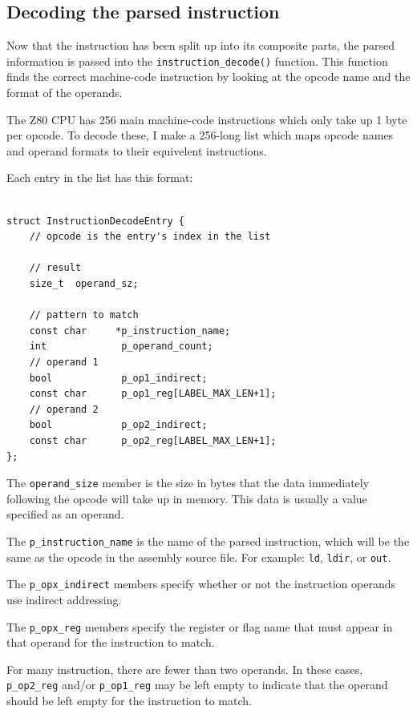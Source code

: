 \documentclass[a4paper]{report}
\begin{document}
\subsection{Decoding the parsed instruction}

Now that the instruction has been split up into its composite parts, the parsed
information is passed into the \texttt{instruction\_decode()} function. This
function finds the correct machine-code instruction by looking at the opcode
name and the format of the operands.

The Z80 CPU has 256 main machine-code instructions which only take up 1 byte per
opcode. To decode these, I make a 256-long list which maps opcode names and
operand formats to their equivelent instructions.

Each entry in the list has this format:

\begin{lstlisting}

struct InstructionDecodeEntry {
	// opcode is the entry's index in the list

	// result
	size_t	operand_sz;

	// pattern to match
	const char 	   *p_instruction_name;
	int				p_operand_count;
	// operand 1
	bool			p_op1_indirect;
	const char		p_op1_reg[LABEL_MAX_LEN+1];
	// operand 2
	bool			p_op2_indirect;
	const char		p_op2_reg[LABEL_MAX_LEN+1];
};

\end{lstlisting}

The \texttt{operand\_size} member is the size in bytes that the data immediately
following the opcode will take up in memory. This data is usually a value
specified as an operand.

The \texttt{p\_instruction\_name} is the name of the parsed instruction, which
will be the same as the opcode in the assembly source file. For example:
\texttt{ld}, \texttt{ldir}, or \texttt{out}.

The \texttt{p\_opx\_indirect} members specify whether or not the instruction
operands use indirect addressing.

The \texttt{p\_opx\_reg} members specify the register or flag name that must
appear in that operand for the instruction to match.

For many instruction, there are fewer than two operands. In these cases,
\texttt{p\_op2\_reg} and/or \texttt{p\_op1\_reg} may be left empty to indicate
that the operand should be left empty for the instruction to match.
\end{document}
